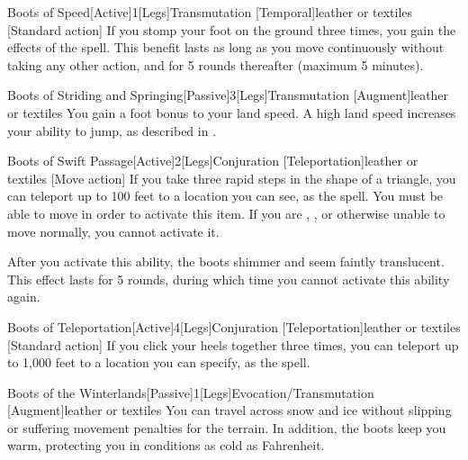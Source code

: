         \begin{magicitemdef}{Boots of Speed}[Active]{1}[Legs]{Transmutation [Temporal]}{leather or textiles}
            [Standard action] If you stomp your foot on the ground three times, you gain the effects of the  spell.
            This benefit lasts as long as you move continuously without taking any other action, and for 5 rounds thereafter (maximum 5 minutes).
        \end{magicitemdef}

        \begin{magicitemdef}{Boots of Striding and Springing}[Passive]{3}[Legs]{Transmutation [Augment]}{leather or textiles}
             You gain a  foot bonus to your land speed.
            A high land speed increases your ability to jump, as described in .
        \end{magicitemdef}

        \begin{magicitemdef}{Boots of Swift Passage}[Active]{2}[Legs]{Conjuration [Teleportation]}{leather or textiles}
            [Move action] If you take three rapid steps in the shape of a triangle, you can teleport up to 100 feet to a location you can see, as the  spell.
            You must be able to move in order to activate this item.
            If you are \grappled, \immobilized, or otherwise unable to move normally, you cannot activate it.

            After you activate this ability, the boots shimmer and seem faintly translucent.
            This effect lasts for 5 rounds, during which time you cannot activate this ability again.
        \end{magicitemdef}

        \begin{magicitemdef}{Boots of Teleportation}[Active]{4}[Legs]{Conjuration [Teleportation]}{leather or textiles}
            [Standard action] If you click your heels together three times, you can teleport up to 1,000 feet to a location you can specify, as the  spell.
        \end{magicitemdef}

        \begin{magicitemdef}{Boots of the Winterlands}[Passive]{1}[Legs]{Evocation/Transmutation [Augment]}{leather or textiles}
             You can travel across snow and ice without slipping or suffering movement penalties for the terrain.
            In addition, the boots keep you warm, protecting you in conditions as cold as  Fahrenheit.
        \end{magicitemdef}

